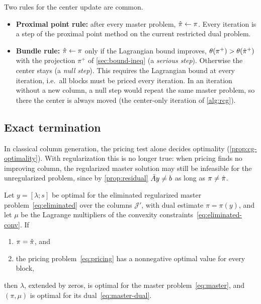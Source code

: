 Two rules for the center update are common.
\begin{itemize}
    \item \textbf{Proximal point rule:} after every master problem, $\hat{\pi}\gets\pi$. Every
          iteration is a step of the proximal point method on the current restricted dual
          problem.
    \item \textbf{Bundle rule:} $\hat{\pi}\gets\pi$ only if the Lagrangian bound improves,
          $\theta(\pi^+) > \theta(\hat{\pi}^+)$ with the projection $\pi^+$ of
          \cref{sec:bound-ineq} (a \emph{serious step}). Otherwise the center stays
          (a \emph{null step}). This requires the Lagrangian bound at every iteration, i.e.\
          all blocks must be priced every iteration. In an iteration without a new column, a
          null step would repeat the same master problem, so there the center is always
          moved (the center-only iteration of \cref{alg:rcg}).
\end{itemize}

\subsection{Exact termination}

In classical column generation, the pricing test alone decides optimality
(\cref{prop:cg-optimality}). With regularization this is no longer true: when pricing finds
no improving column, the regularized master solution may still be infeasible for the
unregularized problem, since by \cref{prop:residual} $\bar{A} y\ne b$ as long as
$\pi\ne\hat{\pi}$.

\begin{theorem} \label{thm:exact-termination}
Let $y = [\lambda; s]$ be optimal for the eliminated regularized master
problem~\eqref{eq:eliminated} over the columns $\mathcal{J}'$, with dual estimate
$\pi = \pi(y)$, and let $\mu$ be the Lagrange multipliers of the convexity
constraints~\eqref{eq:eliminated-conv}. If
\begin{enumerate}
    \item \label{thm:exact-termination:i} $\pi = \hat{\pi}$, and
    \item \label{thm:exact-termination:ii} the pricing problem~\eqref{eq:pricing} has a nonnegative optimal value for every
          block,
\end{enumerate}
then $\lambda$, extended by zeros, is optimal for the master problem~\eqref{eq:master}, and
$(\pi,\mu)$ is optimal for its dual~\eqref{eq:master-dual}.
\end{theorem}

